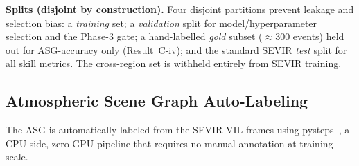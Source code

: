 \documentclass[fleqn,10pt]{wlscirep}
\begin{document}
\textbf{Splits (disjoint by construction).} Four disjoint partitions prevent leakage and selection bias: a \emph{training} set; a \emph{validation} split for model/hyperparameter selection and the Phase-3 gate; a hand-labelled \emph{gold} subset ($\approx$300 events) held out for ASG-accuracy only (Result~C-iv); and the standard SEVIR \emph{test} split for all skill metrics. The cross-region set is withheld entirely from SEVIR training.

\subsection*{Atmospheric Scene Graph Auto-Labeling}

The ASG is automatically labeled from the SEVIR VIL frames using pysteps~\cite{pulkkinen2019pysteps}, a CPU-side, zero-GPU pipeline that requires no manual annotation at training scale.
\end{document}
